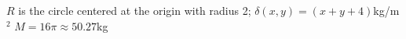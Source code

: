 {$R$ is the circle centered at the origin with radius 2; $\delta(x,y) = (x+y+4)$kg/m$^2$
}
{$M = 16\pi\approx 50.27$kg%
}